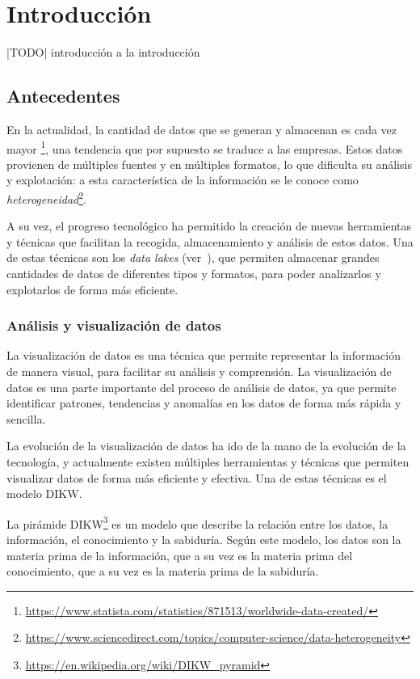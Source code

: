 \chapter{Introducción}\label{chap:intro}
|TODO| introducción a la introducción

\section{Antecedentes}\label{sec:antecedentes}
En la actualidad, la cantidad de datos que se generan y almacenan es cada vez mayor
\footnote{\url{https://www.statista.com/statistics/871513/worldwide-data-created/}}, una tendencia
que por supuesto se traduce a las empresas. Estos datos provienen de múltiples fuentes y en múltiples
formatos, lo que dificulta su análisis y explotación: a esta característica de la información se le
conoce como \textit{heterogeneidad}\footnote{\url{https://www.sciencedirect.com/topics/computer-science/data-heterogeneity}}.

A su vez, el progreso tecnológico ha permitido la creación de nuevas herramientas y técnicas
que facilitan la recogida, almacenamiento y análisis de estos datos. Una de estas técnicas son
los \textit{data lakes} (ver~),
que permiten almacenar grandes cantidades de datos de diferentes tipos y formatos, para poder
analizarlos y explotarlos de forma más eficiente.

\subsection{Análisis y visualización de datos}\label{subsec:datos}
La visualización de datos es una técnica que permite representar la información de manera visual,
para facilitar su análisis y comprensión. La visualización de datos es una parte importante del
proceso de análisis de datos, ya que permite identificar patrones, tendencias y anomalías en los
datos de forma más rápida y sencilla.

La evolución de la visualización de datos ha ido de la mano de la evolución de la tecnología, y
actualmente existen múltiples herramientas y técnicas que permiten visualizar datos de forma
más eficiente y efectiva. Una de estas técnicas es el modelo DIKW.

La pirámide DIKW\footnote{\url{https://en.wikipedia.org/wiki/DIKW_pyramid}} es un modelo que
describe la relación entre los datos, la información, el conocimiento y la sabiduría. Según este
modelo, los datos son la materia prima de la información, que a su vez es la materia prima del
conocimiento, que a su vez es la materia prima de la sabiduría.

